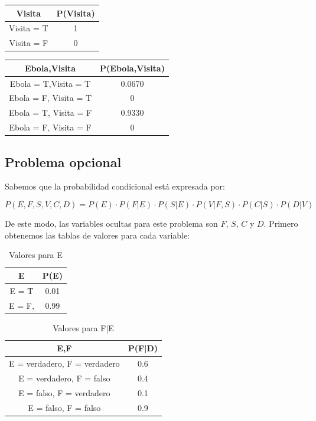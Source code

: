 \documentclass[letterpaper,12pt]{article}
\theoremstyle{definition}
\begin{document}
\begin{table}[H]
	\centering
	\begin{tabular}{|c|c|}
		\toprule
		Visita & P(Visita) \\
		\midrule
		Visita = T & 1 \\
		Visita = F & 0  \\
		\bottomrule
	\end{tabular}
\end{table}

\begin{table}[H]
	\centering
	\begin{tabular}{|c|c|}
		\toprule
		Ebola,Visita & P(Ebola,Visita) \\
		\midrule
		Ebola = T,Visita = T & 0.0670 \\
		Ebola = F, Visita = T & 0  \\
		Ebola = T, Visita = F & 0.9330  \\
		Ebola = F, Visita = F & 0  \\
		\bottomrule
	\end{tabular}
\end{table}


\subsection*{Problema opcional}

Sabemos que la probabilidad condicional está expresada por:


\begin{equation*}
P(E,F,S,V,C,D) = P(E) \cdot P(F|E) \cdot P(S|E) \cdot P(V|F,S) \cdot P(C|S) \cdot P(D|V)
\end{equation*}

De este modo, las variables ocultas para este problema son \(F\), \(S\), \(C\) y \(D\). Primero obtenemos las tablas de valores para cada variable:

\begin{table}[H]
	\centering
	\begin{tabular}{|c|c|}
		\toprule
		E & P(E) \\
		\midrule
		E = T & 0.01 \\
		E = F,& 0.99  \\
		\bottomrule
	\end{tabular}
	\caption{Valores para E}
\end{table}


\begin{table}[H]
	\centering
	\begin{tabular}{|c|c|}
		\toprule
		E,F & P(F|D) \\
		\midrule
		E = verdadero, F = verdadero & 0.6 \\
		E = verdadero, F = falso & 0.4  \\
		E = falso, F = verdadero & 0.1  \\
		E = falso, F = falso & 0.9  \\
		\bottomrule
	\end{tabular}
	\caption{Valores para F|E}
\end{table}
\end{document}
